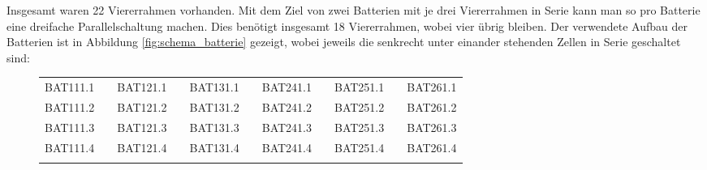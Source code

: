Insgesamt waren 22 Viererrahmen vorhanden. Mit dem Ziel von zwei Batterien mit je drei Viererrahmen in Serie kann man so pro Batterie eine dreifache Parallelschaltung machen. Dies benötigt insgesamt 18 Viererrahmen, wobei vier übrig bleiben. Der verwendete Aufbau der Batterien ist in Abbildung \ref{fig:schema_batterie} gezeigt, wobei jeweils die senkrecht unter einander stehenden Zellen in Serie geschaltet sind:

\begin{figure}[h]
	\centering
	\footnotesize
\begin{tabular}{lp{2mm}lp{2mm}lp{1.5cm}lp{2mm}lp{2mm}l}
\cline{1-1} \cline{3-3} \cline{5-5} \cline{7-7} \cline{9-9} \cline{11-11}
\multicolumn{1}{|l|}{BAT111.1} & \multicolumn{1}{l|}{} & \multicolumn{1}{l|}{BAT121.1} & \multicolumn{1}{l|}{} & \multicolumn{1}{l|}{BAT131.1} & \multicolumn{1}{l|}{} & \multicolumn{1}{l|}{BAT241.1} & \multicolumn{1}{l|}{} & \multicolumn{1}{l|}{BAT251.1} & \multicolumn{1}{l|}{} & \multicolumn{1}{l|}{BAT261.1} \\ \cline{1-1} \cline{3-3} \cline{5-5} \cline{7-7} \cline{9-9} \cline{11-11} 
\multicolumn{1}{|l|}{BAT111.2} & \multicolumn{1}{l|}{} & \multicolumn{1}{l|}{BAT121.2} & \multicolumn{1}{l|}{} & \multicolumn{1}{l|}{BAT131.2} & \multicolumn{1}{l|}{} & \multicolumn{1}{l|}{BAT241.2} & \multicolumn{1}{l|}{} & \multicolumn{1}{l|}{BAT251.2} & \multicolumn{1}{l|}{} & \multicolumn{1}{l|}{BAT261.2} \\ \cline{1-1} \cline{3-3} \cline{5-5} \cline{7-7} \cline{9-9} \cline{11-11} 
\multicolumn{1}{|l|}{BAT111.3} & \multicolumn{1}{l|}{} & \multicolumn{1}{l|}{BAT121.3} & \multicolumn{1}{l|}{} & \multicolumn{1}{l|}{BAT131.3} & \multicolumn{1}{l|}{} & \multicolumn{1}{l|}{BAT241.3} & \multicolumn{1}{l|}{} & \multicolumn{1}{l|}{BAT251.3} & \multicolumn{1}{l|}{} & \multicolumn{1}{l|}{BAT261.3} \\ \cline{1-1} \cline{3-3} \cline{5-5} \cline{7-7} \cline{9-9} \cline{11-11} 
\multicolumn{1}{|l|}{BAT111.4} & \multicolumn{1}{l|}{} & \multicolumn{1}{l|}{BAT121.4} & \multicolumn{1}{l|}{} & \multicolumn{1}{l|}{BAT131.4} & \multicolumn{1}{l|}{} & \multicolumn{1}{l|}{BAT241.4} & \multicolumn{1}{l|}{} & \multicolumn{1}{l|}{BAT251.4} & \multicolumn{1}{l|}{} & \multicolumn{1}{l|}{BAT261.4} \\ \cline{1-1} \cline{3-3} \cline{5-5} \cline{7-7} \cline{9-9} \cline{11-11} 
                               &                       &                               &                       &                               &                       &                               &                       &                               &                       &                               \\ \cline{1-1} \cline{3-3} \cline{5-5} \cline{7-7} \cline{9-9} \cline{11-11} 

\end{tabular}
\end{figure}
